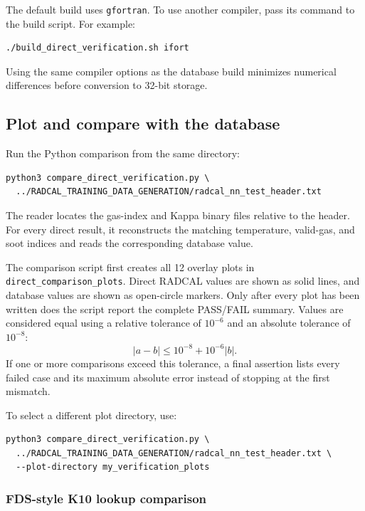 \documentclass[11pt]{article}
\begin{document}
The default build uses \texttt{gfortran}. To use another compiler, pass its
command to the build script. For example:

\begin{verbatim}
./build_direct_verification.sh ifort
\end{verbatim}

Using the same compiler options as the database build minimizes numerical
differences before conversion to 32-bit storage.

\subsection{Plot and compare with the database}

Run the Python comparison from the same directory:

\begin{verbatim}
python3 compare_direct_verification.py \
  ../RADCAL_TRAINING_DATA_GENERATION/radcal_nn_test_header.txt
\end{verbatim}

The reader locates the gas-index and Kappa binary files relative to the header.
For every direct result, it reconstructs the matching temperature, valid-gas,
and soot indices and reads the corresponding database value.

The comparison script first creates all 12 overlay plots in
\texttt{direct\_comparison\_plots}. Direct RADCAL values are shown as solid
lines, and database values are shown as open-circle markers. Only after every
plot has been written does the script report the complete PASS/FAIL summary.
Values are considered equal using a relative tolerance of \(10^{-6}\) and an
absolute tolerance of \(10^{-8}\):
\[
|a-b|\leq 10^{-8}+10^{-6}|b|.
\]
If one or more comparisons exceed this tolerance, a final assertion lists
every failed case and its maximum absolute error instead of stopping at the
first mismatch.

To select a different plot directory, use:

\begin{verbatim}
python3 compare_direct_verification.py \
  ../RADCAL_TRAINING_DATA_GENERATION/radcal_nn_test_header.txt \
  --plot-directory my_verification_plots
\end{verbatim}

\subsubsection{FDS-style K10 lookup comparison}
\end{document}
